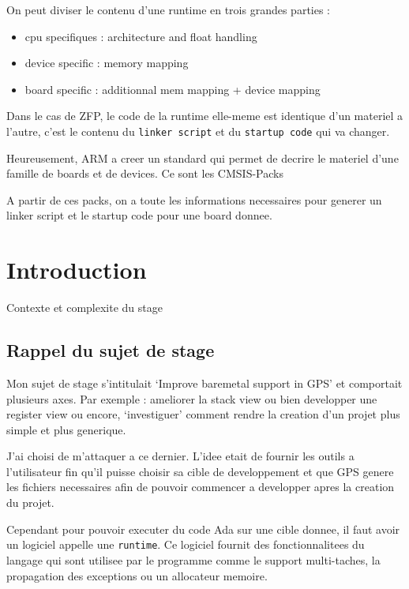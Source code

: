 \documentclass[11pt,]{article}
\providecommand{\tightlist}{%
  \setlength{\itemsep}{0pt}\setlength{\parskip}{0pt}}
\begin{document}
On peut diviser le contenu d'une runtime en trois grandes parties :

\begin{itemize}
\tightlist
\item
  cpu specifiques : architecture and float handling
\item
  device specific : memory mapping
\item
  board specific : additionnal mem mapping + device mapping
\end{itemize}

Dans le cas de ZFP, le code de la runtime elle-meme est identique d'un
materiel a l'autre, c'est le contenu du \texttt{linker\ script} et du
\texttt{startup\ code} qui va changer.

Heureusement, ARM a creer un standard qui permet de decrire le materiel
d'une famille de boards et de devices. Ce sont les CMSIS-Packs

A partir de ces packs, on a toute les informations necessaires pour
generer un linker script et le startup code pour une board donnee.

\section{Introduction}\label{introduction}

Contexte et complexite du stage

\subsection{Rappel du sujet de stage}\label{rappel-du-sujet-de-stage}

Mon sujet de stage s'intitulait `Improve baremetal support in GPS' et
comportait plusieurs axes. Par exemple : ameliorer la stack view ou bien
developper une register view ou encore, `investiguer' comment rendre la
creation d'un projet plus simple et plus generique.

J'ai choisi de m'attaquer a ce dernier. L'idee etait de fournir les
outils a l'utilisateur fin qu'il puisse choisir sa cible de
developpement et que GPS genere les fichiers necessaires afin de pouvoir
commencer a developper apres la creation du projet.

Cependant pour pouvoir executer du code Ada sur une cible donnee, il
faut avoir un logiciel appelle une \texttt{runtime}. Ce logiciel fournit
des fonctionnalitees du langage qui sont utilisee par le programme comme
le support multi-taches, la propagation des exceptions ou un allocateur
memoire.
\end{document}
